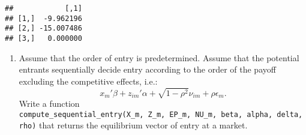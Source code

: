 \documentclass[
]{article}
\providecommand{\tightlist}{%
  \setlength{\itemsep}{0pt}\setlength{\parskip}{0pt}}
\begin{document}
\begin{verbatim}
##            [,1]
## [1,]  -9.962196
## [2,] -15.007486
## [3,]   0.000000
\end{verbatim}

\begin{enumerate}
\def\labelenumi{\arabic{enumi}.}
\setcounter{enumi}{4}
\tightlist
\item
  Assume that the order of entry is predetermined. Assume that the
  potential entrants sequentially decide entry according to the order of
  the payoff excluding the competitive effects, i.e.: \[
  x_m'\beta + z_{im}'\alpha + \sqrt{1 - \rho^2} \nu_{im} + \rho \epsilon_{m}.
  \] Write a function
  \texttt{compute\_sequential\_entry(X\_m,\ Z\_m,\ EP\_m,\ NU\_m,\ beta,\ alpha,\ delta,\ rho)}
  that returns the equilibrium vector of entry at a market.
\end{enumerate}
\end{document}
